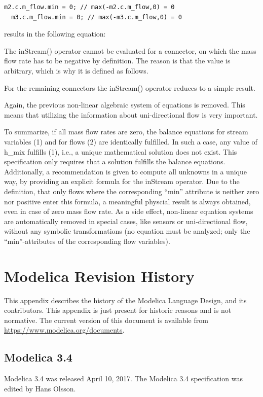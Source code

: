\documentclass[10pt,a4paper]{report}
\def\doublelabel#1{\label{#1}\hypertarget{#1}{}}
\begin{document}
\begin{lstlisting}[language=modelica]
  m2.c.m_flow.min = 0; // max(-m2.c.m_flow,0) = 0
  m3.c.m_flow.min = 0; // max(-m3.c.m_flow,0) = 0
\end{lstlisting}
results in the following equation:

The inStream() operator cannot be evaluated for a connector, on which
the mass flow rate has to be negative by definition. The reason is that
the value is arbitrary, which is why it is defined as follows.

For the remaining connectors the inStream() operator reduces to a simple
result.

Again, the previous non-linear algebraic system of equations is removed.
This means that utilizing the information about uni-directional flow is
very important.

To summarize, if all mass flow rates are zero, the balance equations for
stream variables (1) and for flows (2) are identically fulfilled. In
such a case, any value of h\_mix fulfills (1), i.e., a unique
mathematical solution does not exist. This specification only requires
that a solution fulfills the balance equations. Additionally, a
recommendation is given to compute all unknowns in a unique way, by
providing an explicit formula for the inStream operator. Due to the
definition, that only flows where the corresponding ``min'' attribute is
neither zero nor positive enter this formula, a meaningful physcial
result is always obtained, even in case of zero mass flow rate. As a
side effect, non-linear equation systems are automatically removed in
special cases, like sensors or uni-directional flow, without any
symbolic transformations (no equation must be analyzed; only the
``min''-attributes of the corresponding flow variables).

\chapter{Modelica Revision History}\doublelabel{modelica-revision-history}

This appendix describes the history of the Modelica Language Design, and
its contributors. This appendix is just present for historic reasons and
is not normative. The current version of this document is available from
\url{https://www.modelica.org/documents}.

\section{Modelica 3.4}\doublelabel{modelica-3-4}
Modelica 3.4 was released April 10, 2017. The Modelica 3.4 specification
was edited by Hans Olsson.
\end{document}
